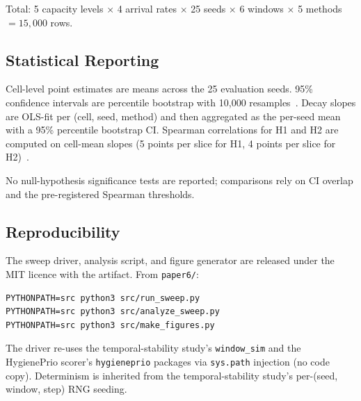Total: 5 capacity levels $\times$ 4 arrival rates $\times$ 25 seeds
$\times$ 6 windows $\times$ 5 methods $= 15{,}000$ rows.

\subsection{Statistical Reporting}

Cell-level point estimates are means across the 25 evaluation seeds.
95\% confidence intervals are percentile bootstrap with 10{,}000
resamples~\cite{efron1994introduction}. Decay slopes are OLS-fit per
(cell, seed, method) and then aggregated as the per-seed mean with a
95\% percentile bootstrap CI. Spearman correlations for H1 and H2 are
computed on cell-mean slopes (5 points per slice for H1, 4 points per
slice for H2)~\cite{spearman1904}.

No null-hypothesis significance tests are reported; comparisons rely on
CI overlap and the pre-registered Spearman thresholds.

\subsection{Reproducibility}

The sweep driver, analysis script, and figure generator are released
under the MIT licence with the artifact. From \texttt{paper6/}:
{\small\begin{verbatim}
PYTHONPATH=src python3 src/run_sweep.py
PYTHONPATH=src python3 src/analyze_sweep.py
PYTHONPATH=src python3 src/make_figures.py
\end{verbatim}}
The driver re-uses the temporal-stability study's \texttt{window\_sim} and the HygienePrio scorer's
\texttt{hygieneprio} packages via \texttt{sys.path} injection (no
code copy). Determinism is inherited from the temporal-stability study's per-(seed, window,
step) RNG seeding.
